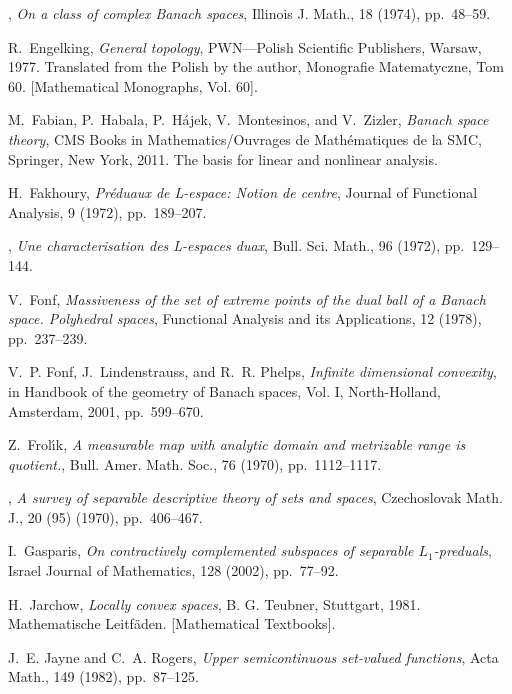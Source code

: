 \documentclass{amsart}
\numberwithin{equation}{section}
\theoremstyle{definition}
\begin{document}
\begin{thebibliography}{10}
\leavevmode\vrule height 2pt depth -1.6pt width 23pt, {\em On a class of
  complex {B}anach spaces}, Illinois J. Math., 18 (1974), pp.~48--59.

{\sc R.~Engelking}, {\em General topology}, PWN---Polish Scientific Publishers,
  Warsaw, 1977.
\newblock Translated from the Polish by the author, Monografie Matematyczne,
  Tom 60. [Mathematical Monographs, Vol. 60].

{\sc M.~Fabian, P.~Habala, P.~H{\'a}jek, V.~Montesinos, and V.~Zizler}, {\em
  Banach space theory}, CMS Books in Mathematics/Ouvrages de Math\'ematiques de
  la SMC, Springer, New York, 2011.
\newblock The basis for linear and nonlinear analysis.

{\sc H.~Fakhoury}, {\em Pr{\'e}duaux de {L}-espace: Notion de centre}, Journal
  of Functional Analysis, 9 (1972), pp.~189--207.

\leavevmode\vrule height 2pt depth -1.6pt width 23pt, {\em Une characterisation
  des {L}-espaces duax}, Bull. Sci. Math., 96 (1972), pp.~129--144.

{\sc V.~Fonf}, {\em Massiveness of the set of extreme points of the dual ball
  of a {B}anach space. {P}olyhedral spaces}, Functional Analysis and its
  Applications, 12 (1978), pp.~237--239.

{\sc V.~P. Fonf, J.~Lindenstrauss, and R.~R. Phelps}, {\em Infinite dimensional
  convexity}, in Handbook of the geometry of {B}anach spaces, {V}ol. {I},
  North-Holland, Amsterdam, 2001, pp.~599--670.

{\sc Z.~Frol{\'{\i}}k}, {\em A measurable map with analytic domain and
  metrizable range is quotient.}, Bull. Amer. Math. Soc., 76 (1970),
  pp.~1112--1117.

\leavevmode\vrule height 2pt depth -1.6pt width 23pt, {\em A survey of
  separable descriptive theory of sets and spaces}, Czechoslovak Math. J., 20
  (95) (1970), pp.~406--467.

{\sc I.~Gasparis}, {\em On contractively complemented subspaces of separable
  {$L_1$}-preduals}, Israel Journal of Mathematics, 128 (2002), pp.~77--92.

{\sc H.~Jarchow}, {\em Locally convex spaces}, B. G. Teubner, Stuttgart, 1981.
\newblock Mathematische Leitf{\"a}den. [Mathematical Textbooks].

{\sc J.~E. Jayne and C.~A. Rogers}, {\em Upper semicontinuous set-valued
  functions}, Acta Math., 149 (1982), pp.~87--125.


\end{thebibliography}
\end{document}
